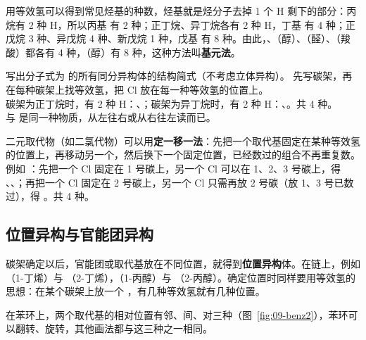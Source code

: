 用等效氢可以得到常见烃基的种数，烃基就是烃分子去掉 1 个 H 剩下的部分：丙烷有 2 种 H，所以丙基  有 2 种；正丁烷、异丁烷各有 2 种 H，丁基  有 4 种；正戊烷 3 种、异戊烷 4 种、新戊烷 1 种，戊基  有 8 种。由此，、（醇）、（醛）、（羧酸）都各有 4 种，（醇）有 8 种，这种方法叫\textbf{基元法}。

\begin{liti}[基础]
写出分子式为  的所有同分异构体的结构简式（不考虑立体异构）。
\tcblower
\silu 先写碳架，再在每种碳架上找等效氢，把 Cl 放在每一种等效氢的位置上。\\
\jie 碳架为正丁烷时，有 2 种 H：、；碳架为异丁烷时，有 2 种 H：、。共 4 种。\\
\xianjing {} 与  是同一种物质，从左往右或从右往左读而已。
\end{liti}

二元取代物（如二氯代物）可以用\textbf{定一移一法}：先把一个取代基固定在某种等效氢的位置上，再移动另一个，然后换下一个固定位置，已经数过的组合不再重复数。例如 ：先把一个 Cl 固定在 1 号碳上，另一个 Cl 可以在 1、2、3 号碳上，得 、、；再把一个 Cl 固定在 2 号碳上，另一个 Cl 只需再放 2 号碳（放 1、3 号已数过），得 。共 4 种。

\subsection{位置异构与官能团异构}
碳架确定以后，官能团或取代基放在不同位置，就得到\textbf{位置异构}体。在链上，例如 （1-丁烯）与 （2-丁烯），（1-丙醇）与 （2-丙醇）。确定位置时同样要用等效氢的思想：在某个碳架上放一个 ，有几种等效氢就有几种位置。

在苯环上，两个取代基的相对位置有邻、间、对三种（图~\ref{fig:09-benz2}），苯环可以翻转、旋转，其他画法都与这三种之一相同。


